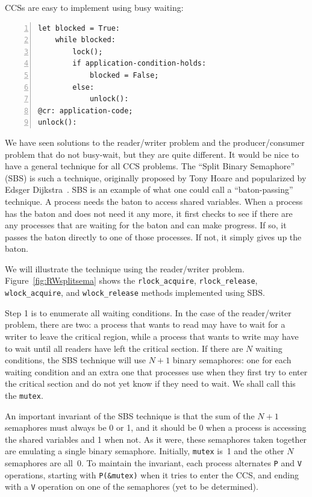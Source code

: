 \documentclass{report}
\newenvironment{code}{
\tcolorbox
}{
\endtcolorbox
}
\begin{document}
CCSs are easy to implement using busy waiting:
\begin{code}
\begin{Verbatim}[xleftmargin=5mm,numbers=left]
let blocked = True:
    while blocked:
        lock();
        if application-condition-holds:
            blocked = False;
        else:
            unlock():
@cr: application-code;
unlock():
\end{Verbatim}
\end{code}

We have seen solutions to the reader/writer problem and the producer/consumer
problem that do not busy-wait, but they are quite different.  It would be nice
to have a general technique for all CCS problems.
The ``Split Binary Semaphore'' (SBS) is such a technique, originally proposed by
Tony Hoare and popularized by Edsger Dijkstra~\cite{EWD703}.
SBS is an example of what one could call a ``baton-passing'' technique.
A process needs the baton to access shared variables.
When a process has the baton and does not need it any more,
it first checks to see if there are any processes that are waiting for the
baton and can make progress.
If so, it passes the baton directly to one of those processes.
If not, it simply gives up the baton.

We will illustrate the technique using the reader/writer problem.
Figure~\ref{fig:RWsplitsema} shows the
\texttt{rlock\_acquire}, \texttt{rlock\_release},
\texttt{wlock\_acquire}, and \texttt{wlock\_release} methods implemented using
SBS.

Step 1 is to enumerate all waiting conditions.  In the case of the reader/writer
problem, there are two: a process that wants to read may have to wait for a
writer to leave the critical region, while a process that wants to write may
have to wait until all readers have left the critical section.  If there are $N$
waiting conditions, the SBS technique will use $N+1$ binary semaphores: one for
each waiting condition and an extra one that processes use when they first try
to enter the critical section and do not yet know if they need to wait.
We shall call this the \texttt{mutex}.

An important invariant of the SBS technique is that the sum of the $N+1$ semaphores
must always be 0 or 1, and it should be 0 when a process is accessing the shared
variables and 1 when not.
As it were, these semaphores taken together are emulating a single binary semaphore.
Initially, \texttt{mutex} is~1 and the other $N$ semaphores
are all~0.  To maintain the invariant, each process alternates \texttt{P} and
\texttt{V} operations, starting with \texttt{P(\&mutex)} when it tries to
enter the CCS, and ending with a \texttt{V} operation on one of the semaphores
(yet to be determined).
\end{document}
